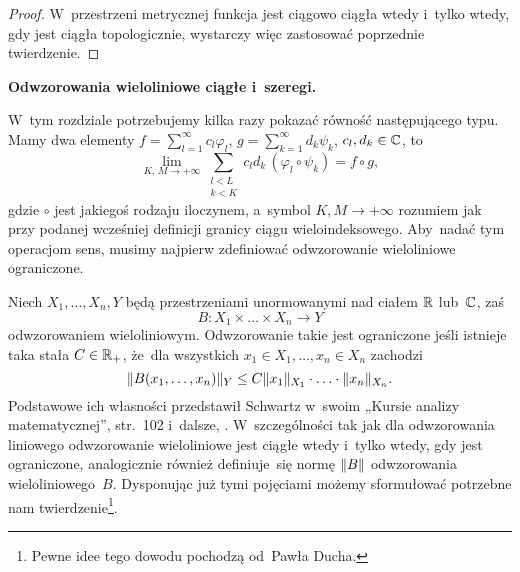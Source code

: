 \documentclass[a4paper,11pt]{article}
\begin{document}
\begin{proof}

  W~przestrzeni metrycznej funkcja jest ciągowo ciągła wtedy i~tylko wtedy, gdy jest
  ciągła topologicznie, wystarczy więc zastosować poprzednie
  twierdzenie.

\end{proof}

\vspace{\spaceFour}



\start \textbf{Odwzorowania wieloliniowe ciągłe i~szeregi.}

W~tym
rozdziale potrzebujemy kilka razy pokazać równość następującego typu.
Mamy dwa elementy $f = \sum_{ l = 1 }^{ \infty } c_{ l } \varphi_{ l }$,
$g = \sum_{ k = 1 }^{ \infty } d_{ k } \psi_{ k }$,
$c_{ l }, d_{ k } \in \mathbb{C}$, to
\begin{equation*}
  \label{RS-Vol-I-s02-01}
  \lim\limits_{ K,\, M \to +\infty } \sum_{ \substack{ l < L \\ k < K } }
  c_{ l } d_{ k } \, ( \varphi_{ l } \circ \psi_{ k } ) = f \circ g,
\end{equation*}
gdzie $\circ$ jest jakiegoś rodzaju iloczynem, a~symbol
$K, M \to +\infty$ rozumiem jak przy podanej wcześniej definicji
granicy ciągu wieloindeksowego. Aby~nadać tym operacjom sens, musimy
najpierw zdefiniować odwzorowanie wieloliniowe ograniczone.

Niech $X_{ 1 }, \ldots, X_{ n }, Y$ będą przestrzeniami unormowanymi nad
ciałem $\mathbb{R}$ lub~$\mathbb{C}$, zaś
\begin{equation}
  \label{RS-Vol-I-s01-13}
  B: X_{ 1 } \times \ldots \times X_{ n } \to Y
\end{equation}
odwzorowaniem wieloliniowym. Odwzorowanie takie jest ograniczone jeśli
istnieje taka stała $C \in \mathbb{R}_{ + }$, że~dla wszystkich
$x_{ 1 } \in X_{ 1 }, \ldots, x_{ n } \in X_{ n }$ zachodzi
\begin{equation}
  \label{RS-Vol-I-02-02}
  \lVert{  B( x_{ 1 }, \ldots, x_{ n } )  }\rVert_{ Y } \leq
  C \lVert{  x_{ 1 }  }\rVert_{ X_{ 1 } } \cdot \ldots \cdot \lVert{  x_{ n }  }\rVert_{ X_{ n } }.
\end{equation}
Podstawowe ich własności przedstawił Schwartz w~swoim „Kursie analizy
matematycznej”, str.~102 i~dalsze,
\cite{SchwartzKursAnalizyMatematycznejVolI1979}. W~szczególności tak jak dla
odwzorowania liniowego odwzorowanie wieloliniowe jest ciągłe wtedy i~tylko wtedy, gdy
jest ograniczone, analogicznie również definiuje~się normę
$\lVert{  B  }\rVert$ odwzorowania wieloliniowego~$B$. Dysponując już tymi
pojęciami możemy sformułować potrzebne nam twierdzenie\footnote{Pewne
  idee tego dowodu pochodzą od~Pawła Ducha.}.
\end{document}
